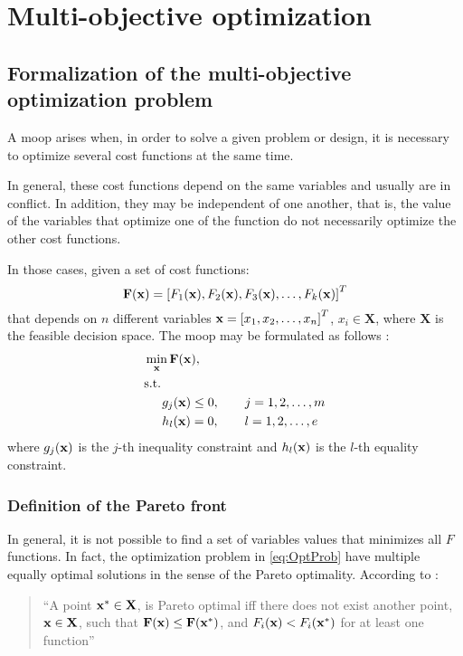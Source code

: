 \chapter{Multi-objective optimization}
\label{sec:Metodolgia}
\section{Formalization of the multi-objective optimization problem}
\label{sec:MOOPForm}
%
A \gls{moop} arises when, in order to solve a given problem or design, it is necessary to optimize several cost functions at the same time. 

In general, these cost functions depend on the same variables and usually are in conflict.  In addition, they may be independent of one another, that is, the value of the variables that optimize one of the function do not necessarily optimize the other cost functions.

In those cases, given a set of cost functions:
\begin{equation}
\mathbf{F}(\mathbf{x})=\left[F_1(\mathbf{x}), F_2(\mathbf{x}), F_3(\mathbf{x}), \ldots, F_k(\mathbf{x})\right]^T
\label{eq:functions}
\end{equation}
%
that depends on $n$ different variables $\mathbf{x}=\left[x_1, x_2, \ldots, x_n \right]^T$, $x_i \in \mathbf{X}$, where $\mathbf{X}$ is the feasible decision space. The \gls{moop} may be formulated as follows \cite{Marler2004}:%
%
\begin{subequations}%
	\begin{align}%
	&\min_\xv \mathbf{F}(\xv), \label{eq:Min01}\\ %
	&\text{s.t.}\nonumber\\%
	& \hspace{5mm} g_j(\xv) \leq 0, \qquad j=1,2,\ldots,m  \label{eq:Min02}\\ %
	& \hspace{5mm} h_l(\xv) = 0, \qquad l=1,2,\ldots,e  \label{eq:Min03}%
	\end{align}%
	\label{eq:OptProb}%
\end{subequations}%
%
where $g_j(\mathbf{x})$ is the $j$-th inequality constraint and $h_l(\mathbf{x})$ is the $l$-th equality constraint. 
%
\subsection{Definition of the Pareto front}
In general, it is not possible to find a set of variables values that minimizes all $F$ functions. In fact, the optimization problem in \eqref{eq:OptProb} have multiple equally optimal solutions in the sense of the Pareto optimality. According to \cite{Marler2004}:
\begin{quote}
	``A point $\mathbf{x}^*\in \mathbf{X}$, is Pareto optimal iff there does not exist another point, $\mathbf{x} \in \mathbf{X}$, such that $\mathbf{F}(\mathbf{x})\leq\mathbf{F}(\mathbf{x}^*)$, and $F_i(\mathbf{x})<F_i(\mathbf{x}^*)$ for at least one function''
\end{quote}

